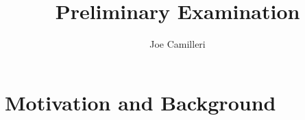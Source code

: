 \documentclass{beamer}
\title[CUPID array]{Preliminary Examination} %
\author{Joe Camilleri} %
\institute[Virginia Tech] %
{
	Virginia Tech \\ %
	\medskip
	\medskip
	\textbf{prelim exam}
}
\date{} %
\begin{document}
	\begin{frame}
		\titlepage %
	\end{frame}
	
	
	
\section{Motivation and Background}
	
\end{document}
